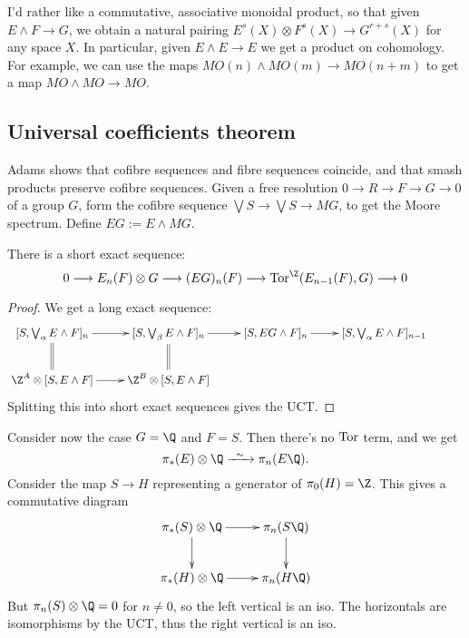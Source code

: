 \documentclass[11pt]{article}
\begin{document}
\begin{KrishanuAdamsStableHtpy}
I'd rather like a commutative, associative monoidal product, so that given $E\wedge F\to G$, we obtain a natural pairing $E^s(X)\otimes F^s(X)\to G^{r+s}(X)$ for any space $X$. In particular, given $E\wedge E\to E$ we get a product on cohomology. For example, we can use the maps $MO(n)\wedge MO(m)\to MO(n+m)$ to get a map $MO\wedge MO\to MO$.
\subsection*{Universal coefficients theorem}
Adams shows that cofibre sequences and fibre sequences coincide, and that smash products preserve cofibre sequences.
Given a free resolution $0\to R\to F\to G\to0$ of a group $G$, form the cofibre sequence $\bigvee S\to\bigvee S\to MG$, to get the Moore spectrum. Define $EG:=E\wedge MG$. 
\begin{thm*}
There is a short exact sequence:
\[0\to E_n(F)\otimes G\to(EG)_n(F)\to\Tor^\Z(E_{n-1}(F),G)\to0\]
\end{thm*}
\begin{proof}
We get a long exact sequence:
\[\xymatrix{
[S,\bigvee_\alpha E\wedge F]_n\ar[r]\ar@{=}[d]&[S,\bigvee_\beta E\wedge F]_n\ar[r]&[S, EG\wedge F]_n\ar[r]&[S,\bigvee_\alpha E\wedge F]_{n-1}&\\%
\Z^A\otimes[S,E\wedge F]\ar[r]&\Z^B\otimes[S,E\wedge F]\ar@{=}[u]
}\]
Splitting this into short exact sequences gives the UCT.
\end{proof}
Consider now the case $G=\Q$ and $F=S$. Then there's no $\operatorname{Tor}$ term, and we get
\[\pi_*(E)\otimes\Q\weakequiv\pi_n(E\Q).\]
Consider the map $S\to H$ representing a generator of $\pi_0(H)=\Z$. This gives a commutative diagram
\[\xymatrix{
\ar[d]\pi_*(S)\otimes\Q\ar[r]& \pi_n(S\Q)\ar[d]\\
\pi_*(H)\otimes\Q\ar[r]&\pi_n(H\Q)
}\]
But $\pi_n(S)\otimes\Q=0$ for $n\neq0$, so the left vertical is an iso. The horizontals are isomorphisms by the UCT, thus the right vertical is an iso.

\noindent[Haynes: can always write $E=\colim \Sigma^{-n}E_n$...

There are maps of spectra which induce zero on every homology theory. Call these `phantoms'. This doesn't happen for cohomology theories.]

\pagebreak
\end{KrishanuAdamsStableHtpy}
\end{document}
